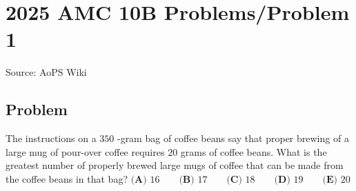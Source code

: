 \documentclass[12pt]{article}
\begin{document}
\section*{{2025 AMC 10B Problems/Problem 1}}
Source: AoPS Wiki

\subsection*{Problem}
The instructions on a $350$ -gram bag of coffee beans say that proper brewing of a large mug of pour-over coffee requires $20$ grams of coffee beans. What is the greatest number of properly brewed large mugs of coffee that can be made from the coffee beans in that bag? $\textbf{(A) } 16 \qquad\textbf{(B) } 17 \qquad\textbf{(C) } 18 \qquad\textbf{(D) } 19 \qquad\textbf{(E) } 20$
\end{document}

